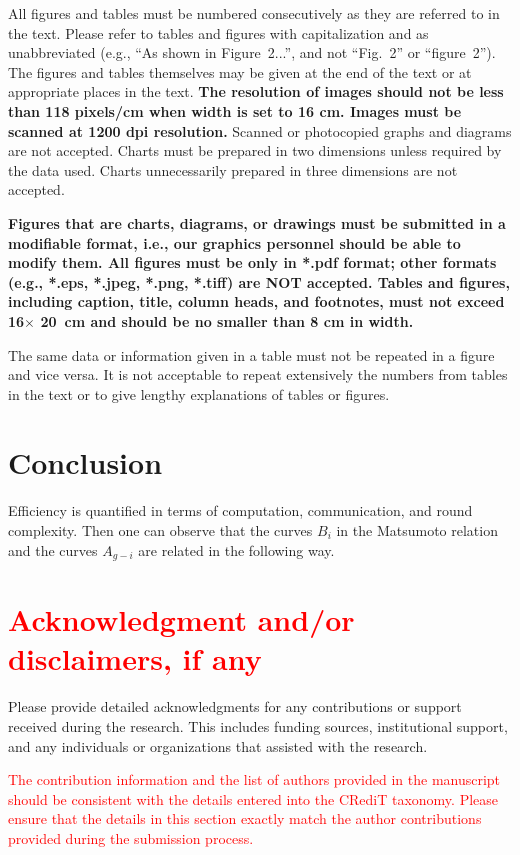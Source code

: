 \documentclass{elektr}
\begin{document}
All figures and tables must be numbered consecutively as they are referred to in the text. Please refer to tables and figures with capitalization and as unabbreviated (e.g., ``As shown in Figure~2...'', and not ``Fig.~2'' or ``figure~2''). The figures and tables themselves may be given at the end of the text or at appropriate places in the text. \textbf{The resolution of images should not be less than 118 pixels/cm when width is set to 16 cm. Images must be scanned at 1200 dpi resolution.} Scanned or photocopied graphs and diagrams are not accepted. Charts must be prepared in two dimensions unless required by the data used. Charts unnecessarily prepared in three dimensions are not accepted.

\textbf{Figures that are charts, diagrams, or drawings must be submitted in a modifiable format, i.e., our graphics personnel should be able to modify them. All figures must be only in *.pdf format; other formats (e.g., *.eps, *.jpeg, *.png, *.tiff) are NOT accepted. Tables and figures, including caption, title, column heads, and footnotes, must not exceed 16$\times$ 20~cm and should be no smaller than 8 cm in width.} 
 
The same data or information given in a table must not be repeated in a figure and vice versa. It is not acceptable to repeat extensively the numbers from tables in the text or to give lengthy explanations of tables or figures.

\section{Conclusion}
\label{Sec:3}
Efficiency is quantified in terms of computation, communication, and round
complexity. Then one can observe that the curves  $B_i$ in the Matsumoto relation and the curves $A_{g-i}$ are related in the following way.

\section*{\textcolor{red} {Acknowledgment and/or disclaimers, if any}}

Please provide detailed acknowledgments for any contributions or support received during the research. This includes funding sources, institutional support, and any individuals or organizations that assisted with the research.

\textcolor{red}{The contribution information and the list of authors provided in the manuscript should be consistent with the details entered into the CRediT taxonomy. Please ensure that the details in this section exactly match the author contributions provided during the submission process.}
\end{document}
